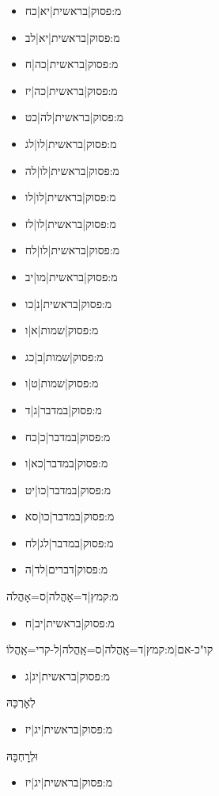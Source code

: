 \begin{itemize}
{{\begin{itemize} \item {{מ:פסוק|בראשית|יא|כח}}\item {{מ:פסוק|בראשית|יא|לב}}\item {{מ:פסוק|בראשית|כה|ח}}\item {{מ:פסוק|בראשית|כה|יז}}\item {{מ:פסוק|בראשית|לה|כט}}\item {{מ:פסוק|בראשית|לו|לג}}\item {{מ:פסוק|בראשית|לו|לה}}\item {{מ:פסוק|בראשית|לו|לו}}\item {{מ:פסוק|בראשית|לו|לז}}\item {{מ:פסוק|בראשית|לו|לח}}\item {{מ:פסוק|בראשית|מו|יב}}\item {{מ:פסוק|בראשית|נ|כו}}\item {{מ:פסוק|שמות|א|ו}}\item {{מ:פסוק|שמות|ב|כג}}\item {{מ:פסוק|שמות|ט|ו}}\item {{מ:פסוק|במדבר|ג|ד}}\item {{מ:פסוק|במדבר|כ|כח}}\item {{מ:פסוק|במדבר|כא|ו}}\item {{מ:פסוק|במדבר|כו|יט}}\item {{מ:פסוק|במדבר|כו|סא}}\item {{מ:פסוק|במדבר|לג|לח}}\item {{מ:פסוק|דברים|לד|ה}}
\end{itemize}
 \item {{מ:קמץ|ד=אׇהֳלֹה|ס=אָהֳלֹה}}
\begin{itemize} \item {{מ:פסוק|בראשית|יב|ח}}
\end{itemize}
 \item {{קו"כ-אם|{{מ:קמץ|ד=אׇֽהֳלֹה|ס=אָֽהֳלֹה}}|ל-קרי=אָֽהֳלוֹ
\begin{itemize} \item {{מ:פסוק|בראשית|יג|ג}}
\end{itemize}
 \item לְאׇרְכָּהּ
\begin{itemize} \item {{מ:פסוק|בראשית|יג|יז}}
\end{itemize}
 \item וּלְרׇחְבָּהּ
\begin{itemize} \item {{מ:פסוק|בראשית|יג|יז}}
\end{itemize}
}}}}
\end{itemize}
